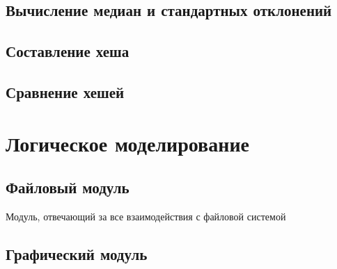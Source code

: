 
\subsection*{Вычисление медиан и стандартных отклонений}


\subsection*{Составление хеша}



\subsection*{Сравнение хешей}




\section{Логическое моделирование}

\subsection{Файловый модуль}

Модуль, отвечающий за все взаимодействия с файловой системой

\subsection{Графический модуль}

